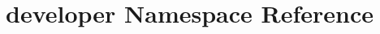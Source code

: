 \hypertarget{namespacedeveloper}{\section{developer Namespace Reference}
\label{namespacedeveloper}
}
